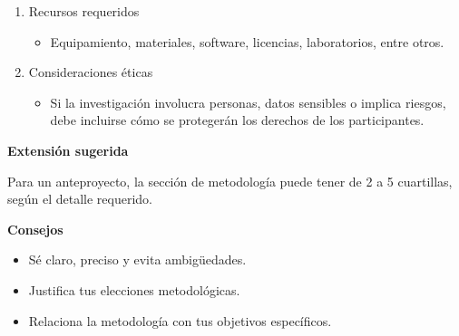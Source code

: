 \begin{enumerate}
    \item Recursos requeridos
    \begin{itemize}
        \item Equipamiento, materiales, software, licencias, laboratorios, entre otros.
    \end{itemize}
    \item Consideraciones éticas
    \begin{itemize}
        \item Si la investigación involucra personas, datos sensibles o implica riesgos, debe incluirse cómo se protegerán los derechos de los participantes.
    \end{itemize}
\end{enumerate}

\textbf{Extensión sugerida}

Para un anteproyecto, la sección de metodología puede tener de 2 a 5 cuartillas, según el detalle requerido.

\textbf{Consejos}

\begin{itemize}
    \item Sé claro, preciso y evita ambigüedades.
    \item Justifica tus elecciones metodológicas.
    \item Relaciona la metodología con tus objetivos específicos.
\end{itemize}